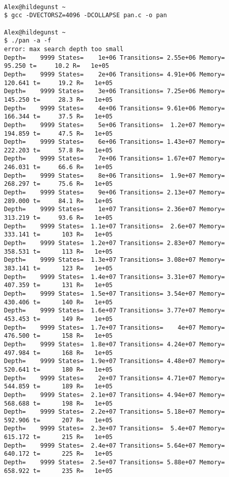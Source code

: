 \documentclass{llncs}
\begin{document}
\begin{lstlisting}

Alex@hildegunst ~
$ gcc -DVECTORSZ=4096 -DCOLLAPSE pan.c -o pan

Alex@hildegunst ~
$ ./pan -a -f
error: max search depth too small
Depth=    9999 States=    1e+06 Transitions= 2.55e+06 Memory=    95.250 t=     10.2 R=   1e+05
Depth=    9999 States=    2e+06 Transitions= 4.91e+06 Memory=   120.641 t=     19.2 R=   1e+05
Depth=    9999 States=    3e+06 Transitions= 7.25e+06 Memory=   145.250 t=     28.3 R=   1e+05
Depth=    9999 States=    4e+06 Transitions= 9.61e+06 Memory=   166.344 t=     37.5 R=   1e+05
Depth=    9999 States=    5e+06 Transitions=  1.2e+07 Memory=   194.859 t=     47.5 R=   1e+05
Depth=    9999 States=    6e+06 Transitions= 1.43e+07 Memory=   222.203 t=     57.8 R=   1e+05
Depth=    9999 States=    7e+06 Transitions= 1.67e+07 Memory=   246.031 t=     66.6 R=   1e+05
Depth=    9999 States=    8e+06 Transitions=  1.9e+07 Memory=   268.297 t=     75.6 R=   1e+05
Depth=    9999 States=    9e+06 Transitions= 2.13e+07 Memory=   289.000 t=     84.1 R=   1e+05
Depth=    9999 States=    1e+07 Transitions= 2.36e+07 Memory=   313.219 t=     93.6 R=   1e+05
Depth=    9999 States=  1.1e+07 Transitions=  2.6e+07 Memory=   333.141 t=      103 R=   1e+05
Depth=    9999 States=  1.2e+07 Transitions= 2.83e+07 Memory=   358.531 t=      113 R=   1e+05
Depth=    9999 States=  1.3e+07 Transitions= 3.08e+07 Memory=   383.141 t=      123 R=   1e+05
Depth=    9999 States=  1.4e+07 Transitions= 3.31e+07 Memory=   407.359 t=      131 R=   1e+05
Depth=    9999 States=  1.5e+07 Transitions= 3.54e+07 Memory=   430.406 t=      140 R=   1e+05
Depth=    9999 States=  1.6e+07 Transitions= 3.77e+07 Memory=   453.453 t=      149 R=   1e+05
Depth=    9999 States=  1.7e+07 Transitions=    4e+07 Memory=   476.500 t=      158 R=   1e+05
Depth=    9999 States=  1.8e+07 Transitions= 4.24e+07 Memory=   497.984 t=      168 R=   1e+05
Depth=    9999 States=  1.9e+07 Transitions= 4.48e+07 Memory=   520.641 t=      180 R=   1e+05
Depth=    9999 States=    2e+07 Transitions= 4.71e+07 Memory=   544.859 t=      189 R=   1e+05
Depth=    9999 States=  2.1e+07 Transitions= 4.94e+07 Memory=   568.688 t=      198 R=   1e+05
Depth=    9999 States=  2.2e+07 Transitions= 5.18e+07 Memory=   592.906 t=      207 R=   1e+05
Depth=    9999 States=  2.3e+07 Transitions=  5.4e+07 Memory=   615.172 t=      215 R=   1e+05
Depth=    9999 States=  2.4e+07 Transitions= 5.64e+07 Memory=   640.172 t=      225 R=   1e+05
Depth=    9999 States=  2.5e+07 Transitions= 5.88e+07 Memory=   658.922 t=      235 R=   1e+05

\end{lstlisting}
\end{document}
